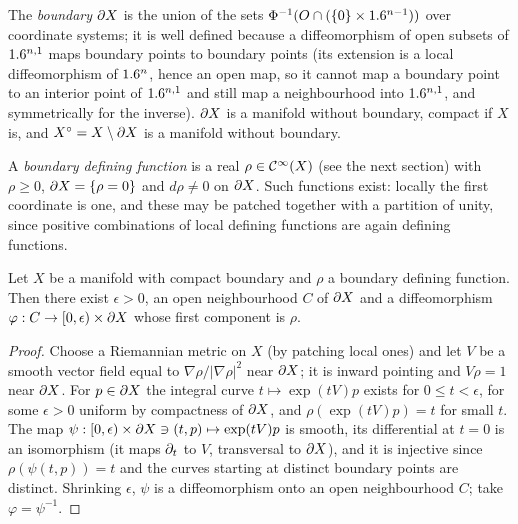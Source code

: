 The \emph{boundary} $\partial X$ is the union of the sets $\Phi^{-1}(O\cap(\{0\}\times
1.6^{n-1}))$ over coordinate systems; it is well defined because a diffeomorphism of
open subsets of $1.6^{n,1}$ maps boundary points to boundary points (its extension is a
local diffeomorphism of $1.6^n$, hence an open map, so it cannot map a boundary point to
an interior point of $1.6^{n,1}$ and still map a neighbourhood into $1.6^{n,1}$, and
symmetrically for the inverse). $\partial X$ is a manifold without boundary, compact if $X$
is, and $X^\circ=X\setminus\partial X$ is a manifold without boundary.

A \emph{boundary defining function} is a real $\rho\in\mathcal{C}^\infty(X)$ (see the next section)
with $\rho\ge0$, $\partial X=\{\rho=0\}$ and $d\rho\ne0$ on $\partial X$. Such functions exist:
locally the first coordinate is one, and these may be patched together with a
partition of unity, since positive combinations of local defining functions are again
defining functions.

\begin{lemma}\label{boundary:lem:collar}
Let $X$ be a manifold with compact boundary and $\rho$ a boundary defining function.
Then there exist $\epsilon>0$, an open neighbourhood $C$ of $\partial X$ and a
diffeomorphism $\varphi:C\to[0,\epsilon)\times\partial X$ whose first component is $\rho$.
\end{lemma}
\begin{proof}
Choose a Riemannian metric on $X$ (by patching local ones) and let $V$ be a smooth
vector field equal to $\nabla\rho/|\nabla\rho|^2$ near $\partial X$; it is inward pointing
and $V\rho=1$ near $\partial X$. For $p\in\partial X$ the integral curve $t\mapsto\exp(tV)p$
exists for $0\le t<\epsilon$, for some $\epsilon>0$ uniform by compactness of $\partial X$,
and $\rho(\exp(tV)p)=t$ for small $t$. The map $\psi:[0,\epsilon)\times\partial X\ni(t,p)
\mapsto\exp(tV)p$ is smooth, its differential at $t=0$ is an isomorphism (it maps
$\partial_t$ to $V$, transversal to $\partial X$), and it is injective since $\rho(\psi(t,p))=t$
and the curves starting at distinct boundary points are distinct. Shrinking $\epsilon$,
$\psi$ is a diffeomorphism onto an open neighbourhood $C$; take $\varphi=\psi^{-1}$.
\end{proof}

